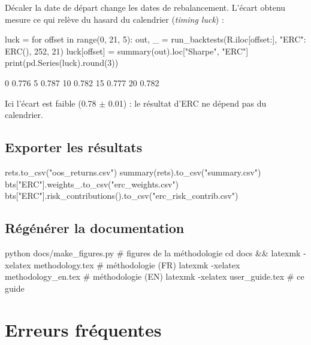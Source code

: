 \documentclass[11pt,a4paper]{article}
\begin{document}
Décaler la date de départ change les dates de rebalancement. L'écart obtenu mesure ce
qui relève du hasard du calendrier (\emph{timing luck}) :

\begin{python}
luck = {}
for offset in range(0, 21, 5):
    out, _ = run_backtests(R.iloc[offset:], {"ERC": ERC()}, 252, 21)
    luck[offset] = summary(out).loc["Sharpe", "ERC"]
print(pd.Series(luck).round(3))
\end{python}
\begin{pyout}
0     0.776
5     0.787
10    0.782
15    0.777
20    0.782
\end{pyout}

Ici l'écart est faible (0.78 $\pm$ 0.01) : le résultat d'ERC ne dépend pas du calendrier.

\subsection{Exporter les résultats}

\begin{python}
rets.to_csv("oos_returns.csv")
summary(rets).to_csv("summary.csv")
bts["ERC"].weights_.to_csv("erc_weights.csv")
bts["ERC"].risk_contributions().to_csv("erc_risk_contrib.csv")
\end{python}

\subsection{Régénérer la documentation}

\begin{shell}
python docs/make_figures.py                     # figures de la méthodologie
cd docs && latexmk -xelatex methodology.tex     # méthodologie (FR)
latexmk -xelatex methodology_en.tex             # méthodologie (EN)
latexmk -xelatex user_guide.tex                 # ce guide
\end{shell}

\section{Erreurs fréquentes}\label{sec:faq}
\end{document}
